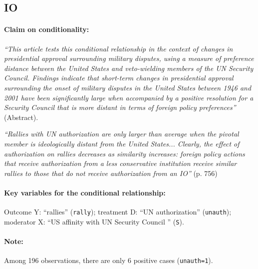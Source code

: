\documentclass[12pt]{article}
\begin{document}
\subsection{\citet{chapman2009audience} IO} \label{chapman}

\paragraph{Claim on conditionality:} \emph{``This article
  tests this conditional relationship in the context of changes in
  presidential approval surrounding military disputes, using a measure
  of preference distance between the United States and veto-wielding
  members of the UN Security Council. Findings indicate that
  short-term changes in presidential approval surrounding the onset of
  military disputes in the United States between 1946 and 2001 have
  been significantly large when accompanied by a positive resolution
  for a Security Council that is more distant in terms of foreign
  policy preferences''} (Abstract). 

\emph{``Rallies with UN authorization are only larger than average
  when the pivotal member is ideologically distant from the United
  States... Clearly, the effect of authorization on rallies decreases
  as similarity increases: foreign policy actions that receive
  authorization from a less conservative institution receive similar
  rallies to those that do not receive authorization from an IO''}
(p. 756)

\paragraph{Key variables for the conditional relationship:} Outcome Y:
``rallies'' (\texttt{rally}); treatment D: ``UN authorization''
(\texttt{unauth}); moderator X: ``US affinity with UN Security Council
'' (\texttt{S}).

\paragraph{Note:}  Among 196 observations, there are only 6 positive cases
(\texttt{unauth=1}). 

\bigskip
\newpage
\end{document}
